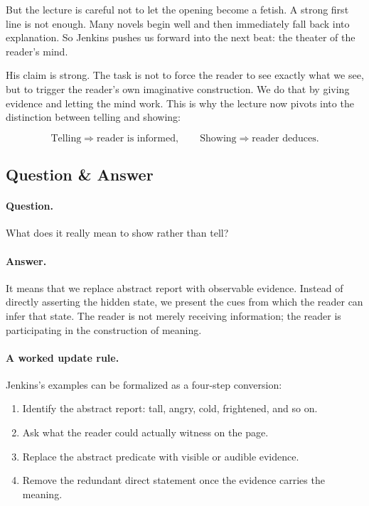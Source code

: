 But the lecture is careful not to let the opening become a fetish. A strong first line is not enough. Many novels begin well and then immediately fall back into explanation. So Jenkins pushes us forward into the next beat: the theater of the reader's mind.

His claim is strong. The task is not to force the reader to see exactly what we see, but to trigger the reader's own imaginative construction. We do that by giving evidence and letting the mind work. This is why the lecture now pivots into the distinction between telling and showing:

\begin{equation}
\text{Telling} \Rightarrow \text{reader is informed},\qquad
\text{Showing} \Rightarrow \text{reader deduces}.
\end{equation}

\subsection{Question \& Answer}

\paragraph{Question.} What does it really mean to show rather than tell?

\paragraph{Answer.} It means that we replace abstract report with observable evidence. Instead of directly asserting the hidden state, we present the cues from which the reader can infer that state. The reader is not merely receiving information; the reader is participating in the construction of meaning.

\paragraph{A worked update rule.} Jenkins's examples can be formalized as a four-step conversion:

\begin{enumerate}
\item Identify the abstract report: tall, angry, cold, frightened, and so on.
\item Ask what the reader could actually witness on the page.
\item Replace the abstract predicate with visible or audible evidence.
\item Remove the redundant direct statement once the evidence carries the meaning.
\end{enumerate}

